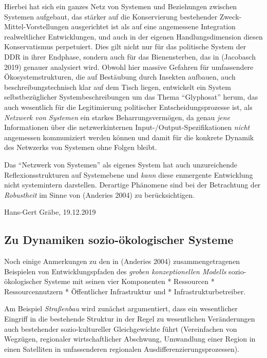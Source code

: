 \documentclass[11pt,a4paper]{article}
\begin{document}
Hierbei hat sich ein ganzes Netz von Systemen und Beziehungen zwischen
Systemen aufgebaut, das stärker auf die Konservierung bestehender
Zweck-Mittel-Vorstellungen ausgerichtet ist als auf eine angemessene
Integration realweltlicher Entwicklungen, und auch in der eigenen
Handlungsdimension diesen Konservatismus perpetuiert. Dies gilt nicht
nur für das politische System der DDR in ihrer Endphase, sondern auch
für das Bienensterben, das in (Jacobasch 2019) genauer analysiert wird.
Obwohl hier massive Gefahren für umfassendere Ökosystemstrukturen, die
auf Bestäubung durch Insekten aufbauen, auch beschreibungstechnisch klar
auf dem Tisch liegen, entwickelt ein System selbstbezüglicher
Systembeschreibungen um das Thema ``Glyphosat'' herum, das auch
wesentlich für die Legitimierung politischer Entscheidungsprozesse ist,
als \emph{Netzwerk von Systemen} ein starkes Beharrungsvermögen, da
genau \emph{jene} Informationen über die netzwerkinternen
Input-/Output-Spezifikationen \emph{nicht} angemessen kommuniziert
werden können und damit für die konkrete Dynamik des Netwzerks von
Systemen ohne Folgen bleibt.

Das ``Netzwerk von Systemen'' als eigenes System hat auch unzureichende
Reflexionsstrukturen auf Systemebene und \emph{kann} diese enmergente
Entwicklung nicht systemintern darstellen. Derartige Phänomene sind bei
der Betrachtung der \emph{Robustheit} im Sinne von (Anderies 2004) zu
berücksichtigen.

Hans-Gert Gräbe, 19.12.2019

\hypertarget{zu-dynamiken-sozio-uxf6kologischer-systeme}{%
\subsection{Zu Dynamiken sozio-ökologischer
Systeme}\label{zu-dynamiken-sozio-uxf6kologischer-systeme}}

Noch einige Anmerkungen zu den in (Anderies 2004) zusammengetragenen
Beispielen von Entwicklungspfaden des \emph{groben konzeptionellen
Modells} sozio-ökologischer Systeme mit seinen vier Komponenten *
Ressourcen * Ressourcennutzern * Öffentlicher Infrastruktur und *
Infrastrukturbetreiber.

Am Beispiel \emph{Straßenbau} wird zunächst argumentiert, dass ein
wesentlicher Eingriff in die bestehende Struktur in der Regel zu
wesentlichen Veränderungen auch bestehender sozio-kultureller
Gleichgewichte führt (Vereinfachen von Wegzügen, regionaler
wirtschaftlicher Abschwung, Umwandlung einer Region in einen Satelliten
in unfassenderen regionalen Ausdifferenzierungsprozessen).
\end{document}
